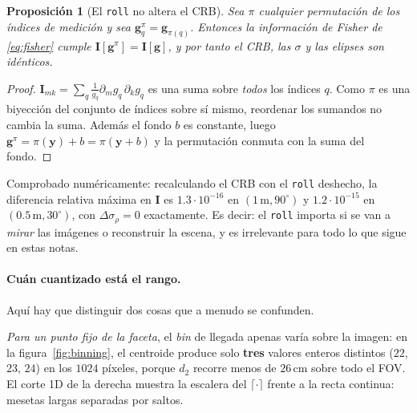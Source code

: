 \documentclass[11pt,a4paper]{article}
\newcommand{\vect}[1]{\boldsymbol{#1}}
\newcommand{\matr}[1]{\mathbf{#1}}
\newcommand{\code}[1]{\texttt{#1}}
\theoremstyle{definition}
\theoremstyle{plain}
\newtheorem{prop}{Proposición}
\begin{document}
\begin{prop}[El \code{roll} no altera el CRB]
\label{prop:roll}
Sea $\pi$ cualquier permutación de los índices de medición y sea
$\vect g^\pi_q=\vect g_{\pi(q)}$. Entonces la información de Fisher de
\eqref{eq:fisher} cumple $\matr I[\vect g^\pi]=\matr I[\vect g]$, y por tanto el
CRB, las $\sigma$ y las elipses son idénticos.
\end{prop}

\begin{proof}
$\matr I_{mk}=\sum_q \frac{1}{g_q}\partial_m g_q\,\partial_k g_q$ es una suma
sobre \emph{todos} los índices $q$. Como $\pi$ es una biyección del conjunto de
índices sobre sí mismo, reordenar los sumandos no cambia la suma. Además el
fondo $b$ es constante, luego $\vect g^\pi=\pi(\vect y)+b=\pi(\vect y+b)$ y la
permutación conmuta con la suma del fondo.
\end{proof}

Comprobado numéricamente: recalculando el CRB con el \code{roll} deshecho, la
diferencia relativa máxima en $\matr I$ es $1.3\cdot10^{-16}$ en
$(1\,\text{m},90^\circ)$ y $1.2\cdot10^{-15}$ en $(0.5\,\text{m},30^\circ)$, con
$\Delta\sigma_\rho=0$ exactamente. Es decir: el \code{roll} importa si se van a
\emph{mirar} las imágenes o reconstruir la escena, y es irrelevante para todo lo
que sigue en estas notas.

\paragraph{Cuán cuantizado está el rango.}
Aquí hay que distinguir dos cosas que a menudo se confunden.

\emph{Para un punto fijo de la faceta}, el \emph{bin} de llegada apenas varía
sobre la imagen: en la figura~\ref{fig:binning}, el centroide produce solo
\textbf{tres} valores enteros distintos ($22$, $23$, $24$) en los $1024$
píxeles, porque $d_2$ recorre menos de $26\,$cm sobre todo el FOV. El corte 1D
de la derecha muestra la escalera del $\lceil\cdot\rceil$ frente a la recta
continua: mesetas largas separadas por saltos.
\end{document}
